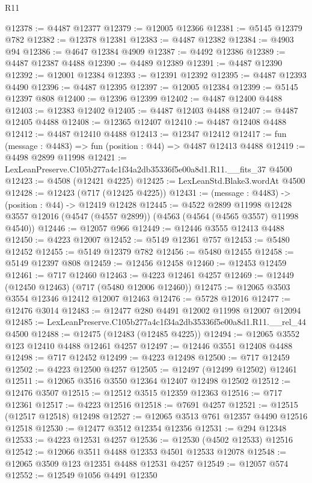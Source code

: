 \begin{lexlean}{R11}
\begin{coremodule}
@12378 := @4487 @12377
@12379 := @12005 @12366
@12381 := @5145 @12379 @782
@12382 := @12378 @12381
@12383 := @4487 @12382
@12384 := @4903 @94
@12386 := @4647 @12384 @4909
@12387 := @4492 @12386
@12389 := @4487 @12387 @4488
@12390 := @4489 @12389
@12391 := @4487 @12390
@12392 := @12001 @12384
@12393 := @12391 @12392
@12395 := @4487 @12393 @4490
@12396 := @4487 @12395
@12397 := @12005 @12384
@12399 := @5145 @12397 @808
@12400 := @12396 @12399
@12402 := @4487 @12400 @4488
@12403 := @12383 @12402
@12405 := @4487 @12403 @4488
@12407 := @4487 @12405 @4488
@12408 := @12365 @12407
@12410 := @4487 @12408 @4488
@12412 := @4487 @12410 @4488
@12413 := @12347 @12412
@12417 := fun (message : @4483) => fun (position : @44) => @4487 @12413 @4488
@12419 := @4498 @2899 @11998
@12421 := LexLeanPreserve.C105b277a4c1f34a2db35336f5e00a8d1.R11.__fits_37 @4500
@12423 := @4508 (@12421 @4225)
@12425 := LexLeanStd.Blake3.wordAt @4500
@12428 := @12423 (@717 (@12425 @4225))
@12431 := (message : @4483) -> (position : @44) -> @12419 @12428
@12445 := @4522
    @2899
    @11998
    @12428
    @3557
    @12016
    (@4547 (@4557 @2899))
    (@4563 (@4564 (@4565 @3557) @11998 @4540))
@12446 := @12057 @966
@12449 := @12446 @3555 @12413 @4488
@12450 := @4223 @12007
@12452 := @5149 @12361 @757
@12453 := @5480 @12452
@12455 := @5149 @12379 @782
@12456 := @5480 @12455
@12458 := @5149 @12397 @808
@12459 := @12456 @12458
@12460 := @12453 @12459
@12461 := @717 @12460
@12463 := @4223 @12461 @4257
@12469 := @12449 (@12450 @12463) (@717 (@5480 @12006 @12460))
@12475 := @12065 @3503 @3554 @12346 @12412 @12007 @12463
@12476 := @5728 @12016
@12477 := @12476 @3014
@12483 := @12477 @280 @4491 @12002 @11998 @12007 @12094
@12485 := LexLeanPreserve.C105b277a4c1f34a2db35336f5e00a8d1.R11.__rel_44 @4500
@12488 := @12475 (@12483 (@12485 @4225))
@12494 := @12065 @3552 @123 @12410 @4488 @12461 @4257
@12497 := @12446 @3551 @12408 @4488
@12498 := @717 @12452
@12499 := @4223 @12498
@12500 := @717 @12459
@12502 := @4223 @12500 @4257
@12505 := @12497 (@12499 @12502) @12461
@12511 := @12065 @3516 @3550 @12364 @12407 @12498 @12502
@12512 := @12476 @3507
@12515 := @12512 @3515 @12359 @12363
@12516 := @717 @12361
@12517 := @4223 @12516
@12518 := @7691 @4257
@12521 := @12515 (@12517 @12518) @12498
@12527 := @12065 @3513 @761 @12357 @4490 @12516 @12518
@12530 := @12477 @3512 @12354 @12356
@12531 := @294 @12348
@12533 := @4223 @12531 @4257
@12536 := @12530 (@4502 @12533) @12516
@12542 := @12066 @3511 @4488 @12353 @4501 @12533 @12078
@12548 := @12065 @3509 @123 @12351 @4488 @12531 @4257
@12549 := @12057 @574
@12552 := @12549 @1056 @4491 @12350

\end{coremodule}
\end{lexlean}
